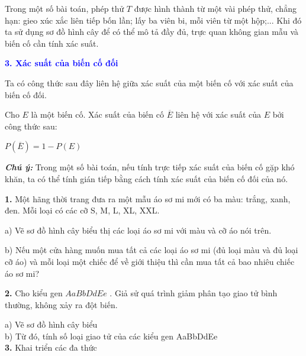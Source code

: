 \documentclass[12pt,a4paper]{extarticle}
\begin{document}
\vspace{0.1cm}
\vspace{0.1cm}
Trong một số bài toán, phép thử $T$ được hình thành từ một vài phép thử, chẳng hạn: gieo xúc xắc liên tiếp bốn lần; lấy ba viên bi, mỗi viên từ một hộp;... Khi đó ta sử dụng sơ đồ hình cây để có thể mô tả đầy đủ, trực quan không gian mẫu và biến cố cần tính xác suất.
\vspace{0.1cm}



\vspace{0.2cm}

\vspace{0.5cm}
\noindent \textbf{\textcolor{blue}{3. Xác suất của biến cố đối}}

\noindent Ta có công thức sau đây liên hệ giữa xác suất của một biến cố với xác suất của biến cố đối.

\vspace{0.1cm}

\vspace{0.1cm}
Cho $E$ là một biến cố. Xác suất của biến cố $\overline{E}$ liên hệ với xác suất của $E$ bởi công thức sau:
\begin{center}
    $P(\overline{E}) = 1 - P(E)$
\end{center}
\vspace{0.1cm}


\vspace{0.2cm}
\noindent \textbf{\textit{Chú ý:}} Trong một số bài toán, nếu tính trực tiếp xác suất của biến cố gặp khó khăn, ta có thể tính gián tiếp bằng cách tính xác suất của biến cố đối của nó.
\vspace{0.5cm}


\textbf{{1.}} Một hãng thời trang đưa ra một mẫu áo sơ mi mới có ba màu: trắng, xanh, đen. Mỗi loại có các cỡ S, M, L, XL, XXL.

a) Vẽ sơ đồ hình cây biểu thị các loại áo sơ mi với màu và cỡ áo nói trên.

b) Nếu một cửa hàng muốn mua tất cả các loại áo sơ mi (đủ loại màu và đủ loại cỡ áo) và mỗi loại một chiếc để về giới thiệu thì cần mua tất cả bao nhiêu chiếc áo sơ mi?

\vspace{0.2cm}
\textbf{{2.}} Cho kiểu gen $AaBbDdEe$ . Giả sử quá trình giảm phân tạo giao tử bình thường, không xảy ra đột biến.

a) Vẽ sơ đồ hình cây biểu\\ 
b) Từ đó, tính số loại giao tử của các kiểu gen AaBbDdEe\\
\textbf{{3.}} Khai triển các đa thức
\end{document}
